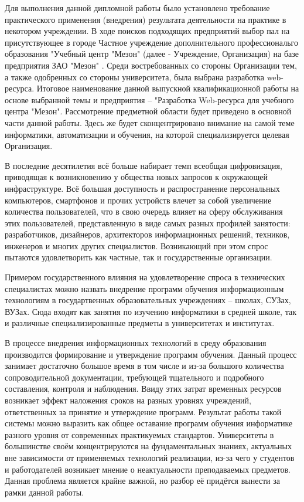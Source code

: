 

Для выполнения данной дипломной работы было установлено требование практического применения (внедрения) результата деятельности на практике в некотором учреждении.
В ходе поисков подходящих предприятий выбор пал на присутствующее в городе Частное учреждение дополнительного профессиональго образования "Учебный центр "Мезон" \cite{meson-uc} (далее - Учреждение, Организация) на базе предприятия ЗАО "Мезон" \cite{meson}.
Среди востребованных со стороны Организации тем, а также одобренных со стороны университета, была выбрана разработка web-ресурса.
Итоговое наименование данной выпускной квалификационной работы на основе выбранной темы и предприятия -- "Разработка Web-ресурса для учебного центра "Мезон".
Рассмотрение предметной области будет приведено в основной части данной работы.
Здесь же будет сконцентрировано внимание на самой теме информатики, автоматизации и обучения, на которой специализируется целевая Организация.

В последние десятилетия всё больше набирает темп всеобщая цифровизация, приводящая к возникновению у общества новых запросов к окружающей инфраструктуре.
Всё большая доступность и распространение персональных компьютеров, смартфонов и прочих устройств влечет за собой увеличение количества пользователей, что в свою очередь влияет на сферу обслуживания этих пользователей, представленную в виде самых разных профилей занятости: разработчиков, дизайнеров, архитекторов информационных решений, техников, инженеров и многих других специалистов.
Возникающий при этом спрос пытаются удовлетворить как частные, так и государственные организации.

Примером государственного влияния на удовлетворение спроса в технических специалистах можно назвать внедрение программ обучения информационным технологиям в государтвенных образовательных учреждениях -- школах, СУЗах, ВУЗах.
Сюда входят как занятия по изучению информатики в средней школе, так и различные специализированные предметы в университетах и институтах.

В процессе внедрения информационных технологий в среду образования производится формирование и утверждение программ обучения.
Данный процесс занимает достаточно большое время в том числе и из-за большого количества сопроводительной документации, требующей тщательного и подробного составления, контроля и наблюдения.
Ввиду этих затрат временных ресурсов возникает эффект наложения сроков на разных уровнях учреждений, ответственных за принятие и утверждение программ.
Результат работы такой системы можно выразить как общее оставание программ обучения информатике разного уровня от современных практикуемых стандартов.
Университеты в большинстве своём концентрируются на фундаментальных знаниях, актуальных вне зависимости от применяемых технологий реализации, из-за чего у студентов и работодателей возникает мнение о неактуальности преподаваемых предметов.
Данная проблема является крайне важной, но разбор её придётся вынести за рамки данной работы.

